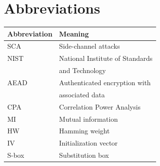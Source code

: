 \documentclass[11pt,technote]{IEEEtran}
\begin{document}
		\appendices
		
		 
		
				
		
		\section{Abbreviations}
		\begin{tabular}{ll}
			\hline
			\textbf{Abbreviation}&\textbf{Meaning}\\
			\hline
			SCA&Side-channel attacks\\
			NIST&National Institute of Standards\\
			&and Technology\\
			AEAD& Authenticated encryption with\\
			&associated data\\
			CPA&Correlation Power Analysis\\
			MI&Mutual information\\
			HW&Hamming weight\\
			IV&Initialization vector\\
			S-box&Substitution box\\
			\hline
		\end{tabular}
		
		
\end{document}
